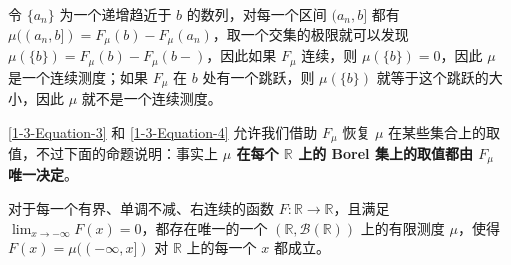 \documentclass[11pt]{article}
\newcommand{\RR}{\mathbb{R}}
\newcommand{\calB}{\mathcal{B}}
\begin{document}
令 $\{a_n\}$ 为一个递增趋近于 $b$ 的数列，对每一个区间 $(a_n,b]$ 都有 $\mu((a_n,b]) = F_\mu(b)-F_\mu(a_n)$，取一个交集的极限就可以发现 $\mu(\{b\}) = F_\mu(b)-F_\mu(b-)$，因此如果 $F_\mu$ 连续，则 $\mu(\{b\})=0$，因此 $\mu$ 是一个连续测度；如果 $F_\mu$ 在 $b$ 处有一个跳跃，则 $\mu(\{b\})$ 就等于这个跳跃的大小，因此 $\mu$ 就不是一个连续测度。

\eqref{1-3-Equation-3} 和 \eqref{1-3-Equation-4} 允许我们借助 $F_\mu$ 恢复 $\mu$ 在某些集合上的取值，不过下面的命题说明：事实上 {\normalfont\bfseries $\mu$ 在每个 $\RR$ 上的 Borel 集上的取值都由 $F_\mu$ 唯一决定}。

\begin{proposition}
    对于每一个有界、单调不减、右连续的函数 $F:\RR\to\RR$，且满足 $\lim_{x\to-\infty} F(x)=0$，都存在唯一的一个 $(\RR,\calB(\RR))$ 上的有限测度 $\mu$，使得 $F(x)=\mu((-\infty,x])$ 对 $\RR$ 上的每一个 $x$ 都成立。
\end{proposition}
\end{document}
